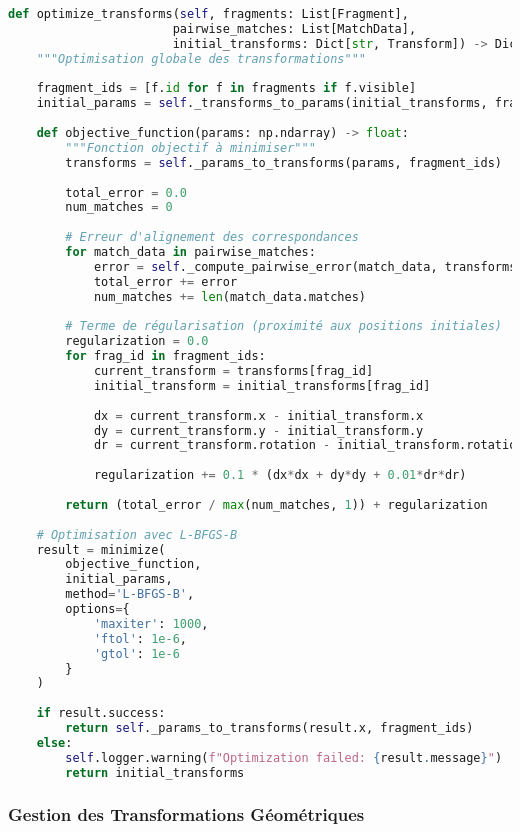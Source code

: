 \documentclass[12pt,a4paper]{report}
\begin{document}
\begin{lstlisting}[language=Python]
def optimize_transforms(self, fragments: List[Fragment], 
                       pairwise_matches: List[MatchData],
                       initial_transforms: Dict[str, Transform]) -> Dict[str, Transform]:
    """Optimisation globale des transformations"""
    
    fragment_ids = [f.id for f in fragments if f.visible]
    initial_params = self._transforms_to_params(initial_transforms, fragment_ids)
    
    def objective_function(params: np.ndarray) -> float:
        """Fonction objectif à minimiser"""
        transforms = self._params_to_transforms(params, fragment_ids)
        
        total_error = 0.0
        num_matches = 0
        
        # Erreur d'alignement des correspondances
        for match_data in pairwise_matches:
            error = self._compute_pairwise_error(match_data, transforms)
            total_error += error
            num_matches += len(match_data.matches)
        
        # Terme de régularisation (proximité aux positions initiales)
        regularization = 0.0
        for frag_id in fragment_ids:
            current_transform = transforms[frag_id]
            initial_transform = initial_transforms[frag_id]
            
            dx = current_transform.x - initial_transform.x
            dy = current_transform.y - initial_transform.y
            dr = current_transform.rotation - initial_transform.rotation
            
            regularization += 0.1 * (dx*dx + dy*dy + 0.01*dr*dr)
        
        return (total_error / max(num_matches, 1)) + regularization
    
    # Optimisation avec L-BFGS-B
    result = minimize(
        objective_function,
        initial_params,
        method='L-BFGS-B',
        options={
            'maxiter': 1000,
            'ftol': 1e-6,
            'gtol': 1e-6
        }
    )
    
    if result.success:
        return self._params_to_transforms(result.x, fragment_ids)
    else:
        self.logger.warning(f"Optimization failed: {result.message}")
        return initial_transforms
\end{lstlisting}

\subsubsection{Gestion des Transformations Géométriques}
\end{document}
